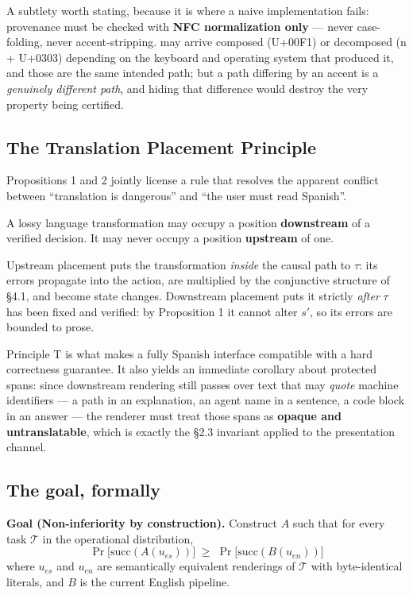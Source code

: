 A subtlety worth stating, because it is where a naive implementation fails: provenance must be checked with \textbf{NFC normalization only} --- never case-folding, never accent-stripping.  may arrive composed (U+00F1) or decomposed (n + U+0303) depending on the keyboard and operating system that produced it, and those are the same intended path; but a path differing by an accent is a \emph{genuinely different path}, and hiding that difference would destroy the very property being certified.

\subsection{The Translation Placement Principle}
\label{sec:translation-placement-principle}

Propositions 1 and 2 jointly license a rule that resolves the apparent conflict between ``translation is dangerous'' and ``the user must read Spanish''.

\begin{principle}[T]
\label{prin:placement}
A lossy language transformation may occupy a position \textbf{downstream} of a verified decision. It may never occupy a position \textbf{upstream} of one.
\end{principle}

Upstream placement puts the transformation \emph{inside} the causal path to $\tau$: its errors propagate into the action, are multiplied by the conjunctive structure of \S4.1, and become state changes. Downstream placement puts it strictly \emph{after} $\tau$ has been fixed and verified: by Proposition 1 it cannot alter $s'$, so its errors are bounded to prose.

Principle T is what makes a fully Spanish interface compatible with a hard correctness guarantee. It also yields an immediate corollary about protected spans: since downstream rendering still passes over text that may \emph{quote} machine identifiers --- a path in an explanation, an agent name in a sentence, a code block in an answer --- the renderer must treat those spans as \textbf{opaque and untranslatable}, which is exactly the \S2.3 invariant applied to the presentation channel.

\subsection{The goal, formally}
\label{sec:goal-formally}

\begin{keyinsight}
\textbf{Goal (Non-inferiority by construction).} Construct $A$ such that for every task $\mathcal{T}$ in the operational distribution,
\begin{equation}
\label{eq:noninferiority-goal}
\Pr\big[\mathrm{succ}(A(u_{es}))\big] \;\ge\; \Pr\big[\mathrm{succ}(B(u_{en}))\big]
\end{equation}
where $u_{es}$ and $u_{en}$ are semantically equivalent renderings of $\mathcal{T}$ with byte-identical literals, and $B$ is the current English pipeline.
\end{keyinsight}

